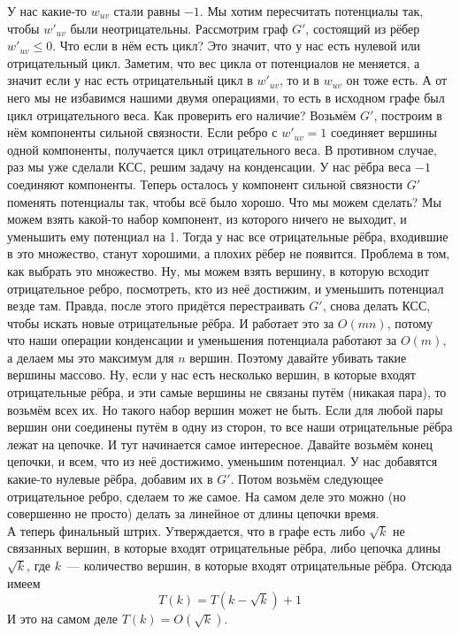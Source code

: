 \documentclass{article}
\begin{document}
    У нас какие-то $w_{uv}$ стали равны $-1$. Мы хотим пересчитать потенциалы так, чтобы $w'_{uv}$ были неотрицательны. Рассмотрим граф $G'$, состоящий из рёбер $w'_{uv}\leqslant0$. Что если в нём есть цикл? Это значит, что у нас есть нулевой или отрицательный цикл. Заметим, что вес цикла от потенциалов не меняется, а значит если у нас есть отрицательный цикл в $w'_{uv}$, то и в $w_{uv}$ он тоже есть. А от него мы не избавимся нашими двумя операциями, то есть в исходном графе был цикл отрицательного веса. Как проверить его наличие? Возьмём $G'$, построим в нём компоненты сильной связности. Если ребро с $w'_{uv}=1$ соединяет вершины одной компоненты, получается цикл отрицательного веса. В противном случае, раз мы уже сделали КСС, решим задачу на конденсации. У нас рёбра веса $-1$ соединяют компоненты. Теперь осталось у компонент сильной связности $G'$ поменять потенциалы так, чтобы всё было хорошо. Что мы можем сделать? Мы можем взять какой-то набор компонент, из которого ничего не выходит, и уменьшить ему потенциал на 1. Тогда у нас все отрицательные рёбра, входившие в это множество, станут хорошими, а плохих рёбер не появится. Проблема в том, как выбрать это множество. Ну, мы можем взять вершину, в которую всходит отрицательное ребро, посмотреть, кто из неё достижим, и уменьшить потенциал везде там. Правда, после этого придётся перестраивать $G'$, снова делать КСС, чтобы искать новые отрицательные рёбра. И работает это за $O(mn)$, потому что наши операции конденсации и уменьшения потенциала работают за $O(m)$, а делаем мы это максимум для $n$ вершин. Поэтому давайте убивать такие вершины массово. Ну, если у нас есть несколько вершин, в которые входят отрицательные рёбра, и эти самые вершины не связаны путём (никакая пара), то возьмём всех их. Но такого набор вершин может не быть. Если для любой пары вершин они соединены путём в одну из сторон, то все наши отрицательные рёбра лежат на цепочке. И тут начинается самое интересное. Давайте возьмём конец цепочки, и всем, что из неё достижимо, уменьшим потенциал. У нас добавятся какие-то нулевые рёбра, добавим их в $G'$. Потом возьмём следующее отрицательное ребро, сделаем то же самое. На самом деле это можно (но совершенно не просто) делать за линейное от длины цепочки время.\\
    А теперь финальный штрих. Утверждается, что в графе есть либо $\sqrt k$ не связанных вершин, в которые входят отрицательные рёбра, либо цепочка длины $\sqrt k$, где $k$~--- количество вершин, в которые входят отрицательные рёбра. Отсюда имеем
    $$
    T(k)=T(k-\sqrt k)+1
    $$
    И это на самом деле $T(k)=O(\sqrt k)$.
\end{document}
